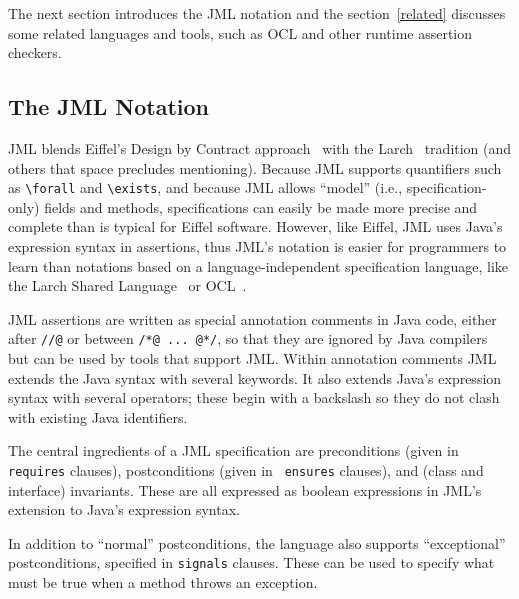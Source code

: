 \medskip

The next section introduces the JML notation and the section~\ref{related} discusses some related
languages and tools, such as OCL and other runtime assertion checkers.

\subsection{The JML Notation}
\label{notation}

JML blends Eiffel's Design by Contract approach~\cite{Meyer97} with
the Larch~\cite{Guttag-Horning93} tradition (and others that space
precludes mentioning).  Because JML supports quantifiers such as
\verb_\forall_ and \verb_\exists_, and because JML allows ``model''
(i.e., specification-only) fields and methods, specifications can
easily be made more precise and complete than is typical for Eiffel software.
However, like Eiffel, JML uses Java's expression syntax in assertions,
thus JML's notation is easier for programmers to learn than notations
based on a language-independent specification language, like the Larch Shared
Language~\cite{Leavens-Baker-Ruby03,Leavens-etal03a} or
OCL~\cite{WarmerKleppe99}.


JML assertions are written as special
annotation comments in Java code,
either after \verb_//@_ or between \verb_/*@ ... @*/_,
so that they are ignored by Java compilers but can be used
by tools that support JML\@.  Within annotation comments JML extends the
Java syntax with several keywords.  It also extends Java's expression syntax with several
operators; these begin with a backslash so they do not
clash with existing Java identifiers.

The central ingredients of a JML specification are preconditions
(given in {\tt requires} clauses), postconditions (given in {\tt
  ensures} clauses), and (class and interface) invariants.  These are
all expressed as boolean expressions in JML's extension to Java's
expression syntax.

In addition to ``normal'' postconditions, the language also supports
``exceptional'' postconditions, specified in {\tt signals} clauses.
These can be used to specify what must be true when a method throws an
exception. 

